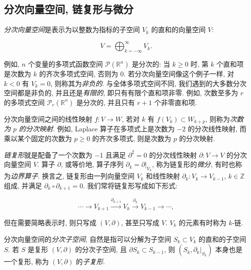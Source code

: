 \subsection{{分次向量空间, 链复形与微分}}\label{sec:graded-chain-complexes}

{\emph{分次向量空间}是表示为以整数为指标的子空间 $V_k$ 的直和的向量空间 $V$:}

\[
V=\bigoplus_{k=-\infty}^{\infty}V_k.
\]

{例如, $n$ 个变量的多项式函数空间 $\mathcal P(\mathbb R^n)$ 是分次的: 当 $k\geq0$ 时, 第 $k$ 个直和项是次数为 $k$ 的齐次多项式空间, 否则为 $0$. 若分次向量空间像这个例子一样, 对 $k<0$ 有 $V_k=0$, 则称其为\emph{非负的}. 与全体多项式空间不同, 我们遇到的大多数分次空间都是非负的, 并且还是\emph{有限的}, 即只有有限个直和项非零. 例如, 次数至多为 $r$ 的多项式空间 $\mathcal P_r(\mathbb R^n)$ 是分次的, 并且只有 $r+1$ 个非零直和项.}

{分次向量空间之间的线性映射 $f:V\to W$, 若对 $k$ 有 $f(V_k)\subset W_{k+p}$, 则称为\emph{次数为 $p$ 的分次映射}. 例如, Laplace 算子在多项式上是次数为 $-2$ 的分次线性映射, 而乘以某个固定的次数为 $p\geq0$ 的齐次多项式, 则是次数为 $p$ 的分次映射.}

{\emph{链复形}就是配备了一个次数为 $-1$ 且满足 $\partial^2=0$ 的分次线性映射 $\partial:V\to V$ 的分次向量空间 $V$. 算子 $\partial$, 或等价地, 算子序列 $\partial_k=\partial|_{V_k}$, 称为链复形的\emph{微分}, 有时也称为\emph{边界算子}. 换言之, 链复形由一列向量空间 $V_k$ 和线性映射 $\partial_k:V_k\to V_{k-1}$, $k\in\mathbb Z$ 组成, 并满足 $\partial_k\circ\partial_{k+1}=0$. 我们常将链复形写成如下形式:}

\[
\cdots\to V_{k+1}\xrightarrow{\partial_{k+1}}V_k\xrightarrow{\partial_k}V_{k-1}\to\cdots,
\]

{但在需要简略表示时, 则只写成 $(V,\partial)$, 甚至只写成 $V$. $V_k$ 的元素有时称为 $k$-链.}

{分次向量空间的\emph{分次子空间}, 自然是指可以分解为子空间 $S_k\subset V_k$ 的直和的子空间 $S$. 若 $S$ 是复形 $(V,\partial)$ 的分次子空间, 且 $\partial S_k\subset S_{k-1}$, 则 $(S_k,\partial_k|_{S_k})$ 本身也是一个复形, 称为 $(V,\partial)$ 的\emph{子复形}.}
